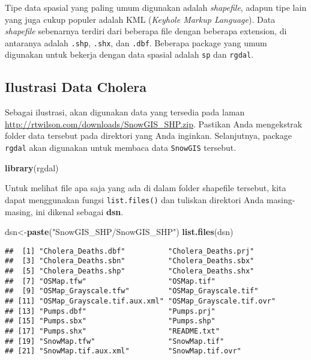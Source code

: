 \documentclass[
]{book}
\newenvironment{Shaded}{\begin{snugshade}}{\end{snugshade}}
\newcommand{\KeywordTok}[1]{\textcolor[rgb]{0.13,0.29,0.53}{\textbf{#1}}}
\newcommand{\NormalTok}[1]{#1}
\newcommand{\StringTok}[1]{\textcolor[rgb]{0.31,0.60,0.02}{#1}}
\begin{document}
Tipe data spasial yang paling umum digunakan adalah \emph{shapefile}, adapun tipe lain yang juga cukup populer adalah KML (\emph{Keyhole Markup Language}). Data \emph{shapefile} sebenarnya terdiri dari beberapa file dengan beberapa extension, di antaranya adalah \texttt{.shp}, \texttt{.shx}, dan \texttt{.dbf}. Beberapa package yang umum digunakan untuk bekerja dengan data spasial adalah \texttt{sp} dan \texttt{rgdal}.

\hypertarget{ilustrasi-data-cholera}{%
\subsection{Ilustrasi Data Cholera}\label{ilustrasi-data-cholera}}

Sebagai ilustrasi, akan digunakan data yang tersedia pada laman \url{http://rtwilson.com/downloads/SnowGIS_SHP.zip}. Pastikan Anda mengekstrak folder data tersebut pada direktori yang Anda inginkan. Selanjutnya, package \texttt{rgdal} akan digunakan untuk membaca data \texttt{SnowGIS} tersebut.

\begin{Shaded}
\begin{Highlighting}[]
\KeywordTok{library}\NormalTok{(rgdal)}
\end{Highlighting}
\end{Shaded}

Untuk melihat file apa saja yang ada di dalam folder shapefile tersebut, kita dapat menggunakan fungsi \texttt{list.files()} dan tuliskan direktori Anda masing-masing, ini dikenal sebagai \textbf{dsn}.

\begin{Shaded}
\begin{Highlighting}[]
\NormalTok{dsn\textless{}{-}}\KeywordTok{paste}\NormalTok{(}\StringTok{"SnowGIS\_SHP/SnowGIS\_SHP"}\NormalTok{)}
\KeywordTok{list.files}\NormalTok{(dsn)}
\end{Highlighting}
\end{Shaded}

\begin{verbatim}
##  [1] "Cholera_Deaths.dbf"          "Cholera_Deaths.prj"         
##  [3] "Cholera_Deaths.sbn"          "Cholera_Deaths.sbx"         
##  [5] "Cholera_Deaths.shp"          "Cholera_Deaths.shx"         
##  [7] "OSMap.tfw"                   "OSMap.tif"                  
##  [9] "OSMap_Grayscale.tfw"         "OSMap_Grayscale.tif"        
## [11] "OSMap_Grayscale.tif.aux.xml" "OSMap_Grayscale.tif.ovr"    
## [13] "Pumps.dbf"                   "Pumps.prj"                  
## [15] "Pumps.sbx"                   "Pumps.shp"                  
## [17] "Pumps.shx"                   "README.txt"                 
## [19] "SnowMap.tfw"                 "SnowMap.tif"                
## [21] "SnowMap.tif.aux.xml"         "SnowMap.tif.ovr"
\end{verbatim}
\end{document}
